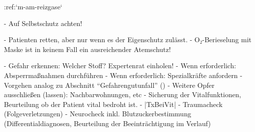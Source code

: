 :ref:`m-am-reizgase`
\begin{enumerate}
  -   Auf Selbstschutz achten!
  \begin{itemize}
    -   Patienten retten, aber nur wenn es der
    Eigenschutz zulässt.
    -   O₂-Berieselung mit Maske ist in keinem Fall
    ein ausreichender Atemschutz!
  \end{itemize}
  -   Gefahr erkennen: Welcher Stoff? Expertenrat einholen!
  -   Wenn erforderlich: Absperrmaßnahmen durchführen
  -   Wenn erforderlich:  Spezialkräfte anfordern
  -   Vorgehen analog zu Abschnitt \enquote{Gefahrengutunfall}
  ()
  -   Weitere Opfer ausschließen (lassen):
  Nachbarwohnungen, etc
  -   Sicherung der Vitalfunktionen, Beurteilung ob der
  Patient vital bedroht ist.
  -   |TxBeiVit| 
  -   Traumacheck (Folgeverletzungen)
  -   Neurocheck inkl. Blutzuckerbestimmung
  (Differentialdiagnosen, Beurteilung der Beeinträchtigung im Verlauf)
\end{enumerate}